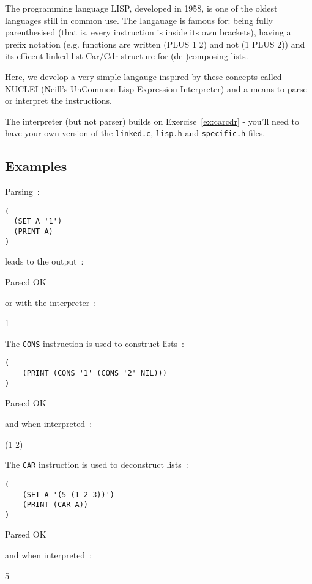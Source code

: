 
The programming language LISP, developed in 1958,
is one of the oldest languages still in common use.
The langauage is famous for: being fully parenthesised (that is,
every instruction is inside its own brackets), having a prefix notation (e.g.
functions are written (PLUS 1 2) and not (1 PLUS 2)) and its efficent
linked-list Car/Cdr structure for (de-)composing lists.

Here, we develop a very simple langauge inspired by these concepts called
NUCLEI (Neill's UnCommon Lisp Expression Interpreter) and a means to
parse or interpret the instructions.

The interpreter (but not parser) builds on Exercise~\ref{ex:carcdr} -
you'll need to have your own version of the \verb^linked.c^,
\verb^lisp.h^ and \verb^specific.h^ files.

\subsection*{Examples}

Parsing~:
\begin{verbatim}
(
  (SET A '1')
  (PRINT A)
)
\end{verbatim}


\noindent leads to the output~:
\begin{terminaloutput}
Parsed OK
\end{terminaloutput}
\noindent or with the interpreter~:
\begin{terminaloutput}
1
\end{terminaloutput}

The \verb^CONS^ instruction is used to construct lists~:
\begin{verbatim}
(
    (PRINT (CONS '1' (CONS '2' NIL)))
)
\end{verbatim}

\begin{terminaloutput}
Parsed OK
\end{terminaloutput}
\noindent and when interpreted~:
\begin{terminaloutput}
(1 2)
\end{terminaloutput}

The \verb^CAR^ instruction is used to deconstruct lists~:
\begin{verbatim}
(
    (SET A '(5 (1 2 3))')
    (PRINT (CAR A))
)
\end{verbatim}
\begin{terminaloutput}
Parsed OK
\end{terminaloutput}
\noindent and when interpreted~:
\begin{terminaloutput}
5
\end{terminaloutput}


